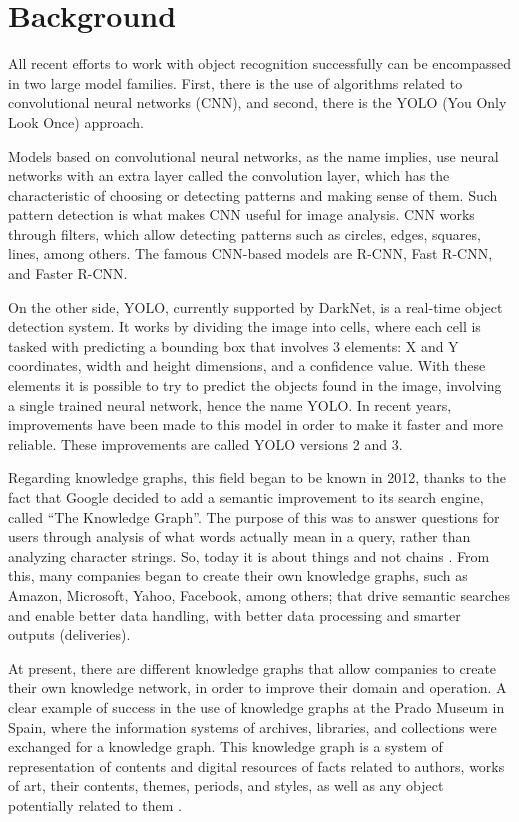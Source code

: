 \section{Background}

All recent efforts to work with object recognition successfully can be encompassed in two large model families. First, there is the use of algorithms related to convolutional neural networks (CNN), and second, there is the YOLO (You Only Look Once) approach.

Models based on convolutional neural networks, as the name implies, use neural networks with an extra layer called the convolution layer, which has the characteristic of choosing or detecting patterns and making sense of them. Such pattern detection is what makes CNN useful for image analysis. CNN works through filters, which allow detecting patterns such as circles, edges, squares, lines, among others. The famous CNN-based models are R-CNN, Fast R-CNN, and Faster R-CNN.

On the other side, YOLO, currently supported by DarkNet, is a real-time object detection system. It works by dividing the image into cells, where each cell is tasked with predicting a bounding box that involves 3 elements: X and Y coordinates, width and height dimensions, and a confidence value. With these elements it is possible to try to predict the objects found in the image, involving a single trained neural network, hence the name YOLO. In recent years, improvements have been made to this model in order to make it faster and more reliable. These improvements are called YOLO versions 2 and 3.

Regarding knowledge graphs, this field began to be known in 2012, thanks to the fact that Google decided to add a semantic improvement to its search engine, called “The Knowledge Graph”. The purpose of this was to answer questions for users through analysis of what words actually mean in a query, rather than analyzing character strings. So, today it is about things and not chains \cite{Barnard}. From this, many companies began to create their own knowledge graphs, such as Amazon, Microsoft, Yahoo, Facebook, among others; that drive semantic searches and enable better data handling, with better data processing and smarter outputs (deliveries).

At present, there are different knowledge graphs that allow companies to create their own knowledge network, in order to improve their domain and operation. A clear example of success in the use of knowledge graphs at the Prado Museum in Spain, where the information systems of archives, libraries, and collections were exchanged for a knowledge graph. This knowledge graph is a system of representation of contents and digital resources of facts related to authors, works of art, their contents, themes, periods, and styles, as well as any object potentially related to them \cite{Museo del Prado}.

